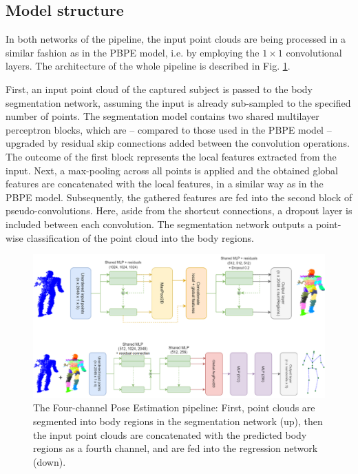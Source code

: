 \subsection{Model structure}
In both networks of the pipeline, the input point clouds are being processed in a similar fashion as in the PBPE model, i.e. by employing the $1 \times 1$ convolutional layers. The architecture of the whole pipeline is described in Fig. \ref{fig:4chan_pipeline}.\par
\vspace{5mm}
\noindent First, an input point cloud of the captured subject is passed to the body segmentation network, assuming the input is already sub-sampled to the specified number of points. The segmentation model contains two shared multilayer perceptron blocks, which are – compared to those used in the PBPE model – upgraded by residual skip connections added between the convolution operations. The outcome of the first block represents the local features extracted from the input. Next, a max-pooling across all points is applied and the obtained global features are concatenated with the local features, in a similar way as in the PBPE model. Subsequently, the gathered features are fed into the second block of pseudo-convolutions. Here, aside from the shortcut connections, a dropout layer is included between each convolution. The segmentation network outputs a point-wise classification of the point cloud into the body regions.\par
\vspace{5mm}
\vspace{5mm}
\begin{figure}[H]
\begin{center}
  \includegraphics[width=\textwidth]{images/implementation/4chan_pipeline_fixed.png}
  \caption[The Four-channel Pose Estimation pipeline.]{ The Four-channel Pose Estimation pipeline: First, point clouds are segmented into body regions in the segmentation network (up), then the input point clouds are concatenated with the predicted body regions as a fourth channel, and are fed into the regression network (down).}
  \label{fig:4chan_pipeline}
\end{center}
\end{figure}

